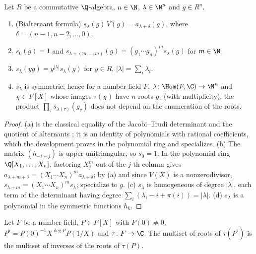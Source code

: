 \begin{lemma}\label{pf:geo:schur}
Let $R$ be a commutative $\Q$-algebra, $n\in\N$, $\lambda\in\N^n$ and $g\in R^n$.
\begin{enumerate}[label=(\alph*),nosep]
\item (Bialternant formula) $s_\lambda(g)\,V(g)=a_{\lambda+\delta}(g)$, where $\delta=(n-1,n-2,\dots,0)$.
\item $s_0(g)=1$ and $s_{\lambda+(m,\dots,m)}(g)=(g_1\cdots g_n)^m s_\lambda(g)$ for $m\in\N$.
\item $s_\lambda(yg)=y^{|\lambda|}s_\lambda(g)$ for $y\in R$, $|\lambda|=\sum_i\lambda_i$.
\item $s_\lambda$ is symmetric; hence for a number field $F$, $\lambda\colon\Hom(F,\C)\to\N^n$ and $\chi\in F[X]$ whose images
  $\tau(\chi)$ have $n$ roots $g_\tau$ (with multiplicity), the product $\prod_\tau s_{\lambda(\tau)}(g_\tau)$ does not depend on
  the enumeration of the roots.
\end{enumerate}
\end{lemma}

\begin{proof}
(a) is the classical equality of the Jacobi--Trudi determinant and the quotient of alternants
\cite[Ch.~I, (3.1), (3.4)]{Macdonald1995}; it is an identity of polynomials with rational coefficients, which
the development proves in the polynomial ring and specializes. (b) The matrix $(h_{-i+j})$ is upper
unitriangular, so $s_0=1$. In the polynomial ring $\Q[X_1,\dots,X_n]$, factoring $X_j^m$ out of the $j$-th column
gives $a_{\lambda+m+\delta}=(X_1\cdots X_n)^ma_{\lambda+\delta}$; by (a) and since $V(X)$ is a nonzerodivisor,
$s_{\lambda+m}=(X_1\cdots X_n)^ms_\lambda$; specialize to $g$. (c) $s_\lambda$ is homogeneous of degree $|\lambda|$, each
term of the determinant having degree $\sum_i(\lambda_i-i+\pi(i))=|\lambda|$. (d) $s_\lambda$ is a polynomial in the
symmetric functions $h_k$.
\end{proof}

\begin{lemma}\label{pf:geo:invroots}
Let $F$ be a number field, $P\in F[X]$ with $P(0)\ne0$, $P^\flat=P(0)^{-1}X^{\deg P}P(1/X)$ and $\tau\colon F\to\C$. The
multiset of roots of $\tau(P^\flat)$ is the multiset of inverses of the roots of $\tau(P)$.
\end{lemma}

